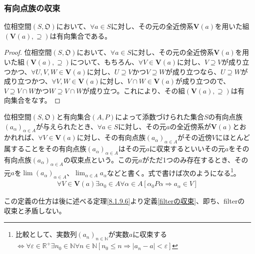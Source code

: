 \documentclass[dvipdfmx]{jsarticle}
\begin{document}
\subsubsection{有向点族の収束}%
\begin{thm}\label{8.1.9.4}
位相空間$\left( S,\mathfrak{O} \right)$において、$\forall a \in S$に対し、その元の全近傍系$\mathbf{V}(a)$を用いた組$\left( \mathbf{V}(a), \supseteq \right)$は有向集合である。
\end{thm}
\begin{proof}
位相空間$\left( S,\mathfrak{O} \right)$において、$\forall a \in S$に対し、その元の全近傍系$\mathbf{V}(a)$を用いた組$\left( \mathbf{V}(a), \supseteq \right)$について、もちろん、$\forall V \in \mathbf{V}(a)$に対し、$V \supseteq V$が成り立つかつ、$\forall U,V,W \in \mathbf{V}(a)$に対し、$U \supseteq V$かつ$V \supseteq W$が成り立つなら、$U \supseteq W$が成り立つかつ、$\forall V,W \in \mathbf{V}(a)$に対し、$V \cap W \in \mathbf{V}(a)$が成り立つので、$V \supseteq V \cap W$かつ$W \supseteq V \cap W$が成り立つ。これにより、その組$\left( \mathbf{V}(a), \supseteq \right)$は有向集合をなす。
\end{proof}
\begin{dfn}\label{有向点族の収束}
位相空間$\left( S,\mathfrak{O} \right)$と有向集合$(A,P)$によって添数づけられた集合$S$の有向点族$\left( a_{\alpha} \right)_{\alpha \in A}$が与えられたとき、$\forall a \in S$に対し、その元$a$の全近傍系が$\mathbf{V}(a)$とおかれれば、$\forall V \in \mathbf{V}(a)$に対し、その有向点族$\left( a_{\alpha} \right)_{\alpha \in A}$がその近傍$V$にほとんど属することをその有向点族$\left( a_{\alpha} \right)_{\alpha \in A}$はその元$a$に収束するといいその元$a$をその有向点族$\left( a_{\alpha} \right)_{\alpha \in A}$の収束点という。この元$a$がただ1つのみ存在するとき、その元$a$を$\lim\left( a_{\alpha} \right)_{\alpha \in A}$、$\lim_{\alpha \in A}a_{\alpha}$などと書く。式で書けば次のようになる\footnote{比較として、実数列$\left( a_{n} \right)_{n \in \mathbb{N}}$が実数$a$に収束する$\Leftrightarrow \forall\varepsilon \in \mathbb{R}^{+}\exists n_{0} \in \mathbb{N}\forall n \in \mathbb{N}\left[ n_{0} \leq n \Rightarrow \left| a_{n} - a \right| < \varepsilon \right]$}。
\begin{align*}
\forall V \in \mathbf{V}(a)\exists\alpha_{0} \in A\forall\alpha \in A\left[ \alpha_{0}P\alpha \Rightarrow a_{\alpha} \in V \right]
\end{align*}
\end{dfn}\par
この定義の仕方は後に述べる定理\ref{8.1.9.6}より定義\ref{filterの収束}、即ち、filterの収束と矛盾しない。
\end{document}
